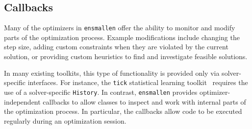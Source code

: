 \subsection{Callbacks}
\label{sec:callbacks}

Many of the optimizers in {\tt ensmallen} offer the ability to monitor
and modify parts of the optimization process.
Example modifications include changing the step size,
adding custom constraints when they are violated by the current solution,
or providing custom heuristics to find and investigate feasible solutions.

In many existing toolkits, this type of functionality is provided only via
solver-specific interfaces.  For instance, the {\tt tick} statistical learning
toolkit~\cite{bacry2017tick} requires the use of a solver-specific {\tt History}.
In contrast, {\tt ensmallen} provides optimizer-independent callbacks to allow
classes to inspect and work with internal parts of the optimization process.
In particular, the callbacks allow code to be
executed regularly during an optimization session.

